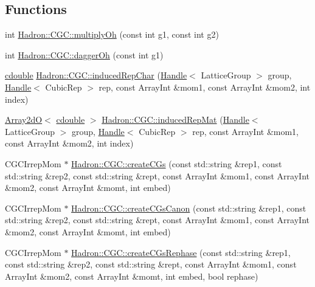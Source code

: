 \subsection*{Functions}
\begin{DoxyCompactItemize}
\item 
int \mbox{\hyperlink{namespaceHadron_1_1CGC_a16432200edf54430116d5593f2f755d6}{Hadron\+::\+C\+G\+C\+::multiply\+Oh}} (const int g1, const int g2)
\item 
int \mbox{\hyperlink{namespaceHadron_1_1CGC_a90d3161b56ca289f2c3f62fa91923dac}{Hadron\+::\+C\+G\+C\+::dagger\+Oh}} (const int g1)
\item 
\mbox{\hyperlink{adat-devel_2main_2irreputils_2cgs__table_8cc_a5f9966666d076841002cd443622b7ccd}{cdouble}} \mbox{\hyperlink{namespaceHadron_1_1CGC_a6508b0e362ceb9df82bdd26575736fc6}{Hadron\+::\+C\+G\+C\+::induced\+Rep\+Char}} (\mbox{\hyperlink{classADAT_1_1Handle}{Handle}}$<$ Lattice\+Group $>$ group, \mbox{\hyperlink{classADAT_1_1Handle}{Handle}}$<$ Cubic\+Rep $>$ rep, const Array\+Int \&mom1, const Array\+Int \&mom2, int index)
\item 
\mbox{\hyperlink{classADAT_1_1Array2dO}{Array2dO}}$<$ \mbox{\hyperlink{adat-devel_2main_2irreputils_2cgs__table_8cc_a5f9966666d076841002cd443622b7ccd}{cdouble}} $>$ \mbox{\hyperlink{namespaceHadron_1_1CGC_aa7e28e013e98896d3053e95ce419f31e}{Hadron\+::\+C\+G\+C\+::induced\+Rep\+Mat}} (\mbox{\hyperlink{classADAT_1_1Handle}{Handle}}$<$ Lattice\+Group $>$ group, \mbox{\hyperlink{classADAT_1_1Handle}{Handle}}$<$ Cubic\+Rep $>$ rep, const Array\+Int \&mom1, const Array\+Int \&mom2, int index)
\item 
C\+G\+C\+Irrep\+Mom $\ast$ \mbox{\hyperlink{namespaceHadron_1_1CGC_a3a95d08c25d8f09a43db0baca8c13e6f}{Hadron\+::\+C\+G\+C\+::create\+C\+Gs}} (const std\+::string \&rep1, const std\+::string \&rep2, const std\+::string \&rept, const Array\+Int \&mom1, const Array\+Int \&mom2, const Array\+Int \&momt, int embed)
\item 
C\+G\+C\+Irrep\+Mom $\ast$ \mbox{\hyperlink{namespaceHadron_1_1CGC_a416e4eef9b4975ce970e2e0ff04a09e6}{Hadron\+::\+C\+G\+C\+::create\+C\+Gs\+Canon}} (const std\+::string \&rep1, const std\+::string \&rep2, const std\+::string \&rept, const Array\+Int \&mom1, const Array\+Int \&mom2, const Array\+Int \&momt, int embed)
\item 
C\+G\+C\+Irrep\+Mom $\ast$ \mbox{\hyperlink{namespaceHadron_1_1CGC_acb590dcbf6bd9f515f07a8e64aa76c0b}{Hadron\+::\+C\+G\+C\+::create\+C\+Gs\+Rephase}} (const std\+::string \&rep1, const std\+::string \&rep2, const std\+::string \&rept, const Array\+Int \&mom1, const Array\+Int \&mom2, const Array\+Int \&momt, int embed, bool rephase)

\end{DoxyCompactItemize}
